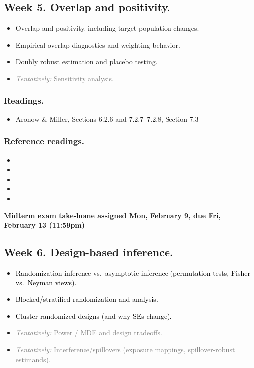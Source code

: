 \documentclass[letterpaper, 12pt, parskip=full,DIV=10]{scrartcl}
\begin{document}
\subsection*{Week 5. Overlap and positivity.}
\begin{itemize}
\item Overlap and positivity, including target population changes.
\item Empirical overlap diagnostics and weighting behavior.
\item Doubly robust estimation and placebo testing.
\item \textcolor{gray}{\textit{Tentatively:} Sensitivity analysis.}
\end{itemize}

\subsubsection*{Readings.}
\begin{itemize}
\item Aronow \& Miller,  Sections 6.2.6 and 7.2.7--7.2.8, Section 7.3
\end{itemize}

\subsubsection*{Reference readings.}
\begin{itemize}
\item {}
\item {}
\item {}
\item {}
\item {}
\end{itemize}

\textbf{Midterm exam take-home assigned Mon, February 9, due Fri, February 13 (11:59pm)}

\subsection*{Week 6. Design-based inference.}
\begin{itemize}
\item \textcolor{black}{Randomization inference vs.\ asymptotic inference (permutation tests, Fisher vs.\ Neyman views).}
\item \textcolor{black}{Blocked/stratified randomization and analysis.}
\item \textcolor{black}{Cluster-randomized designs (and why SEs change).}
\item \textcolor{gray}{\textit{Tentatively:} Power / MDE and design tradeoffs.}
\item \textcolor{gray}{\textit{Tentatively:} Interference/spillovers (exposure mappings, spillover-robust estimands).}
\end{itemize}
\end{document}
